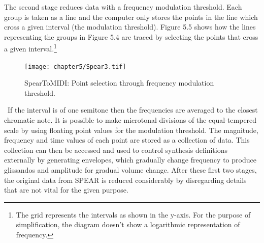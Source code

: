 The second stage reduces data with a frequency modulation threshold. Each group is taken as a line and the computer only stores the points in the line which cross a given interval (the modulation threshold). Figure 5.5 shows how the lines representing the groups in Figure 5.4 are traced by selecting the points that cross a given interval.\footnote{The grid represents the intervals as shown in the y-axis. For the purpose of simplification, the diagram doesn't show a logarithmic representation of frequency.} 
\begin{figure}[htbp] %
   \centering
   \texttt{[image: chapter5/Spear3.tif]} %
   \caption{SpearToMIDI: Point selection through frequency modulation threshold.}
   \label{fig:example}
\end{figure}\
If the interval is of one semitone then the frequencies are averaged to the closest chromatic note. It is possible to make microtonal divisions of the equal-tempered scale by using floating point values for the modulation threshold. The magnitude, frequency and time values of each point are stored as a collection of data. This collection can then be accessed and used to control synthesis definitions externally by generating envelopes, which gradually change frequency to produce glissandos and amplitude for gradual volume change. After these first two stages, the original data from SPEAR is reduced considerably by disregarding details that are not vital for the given purpose. 

